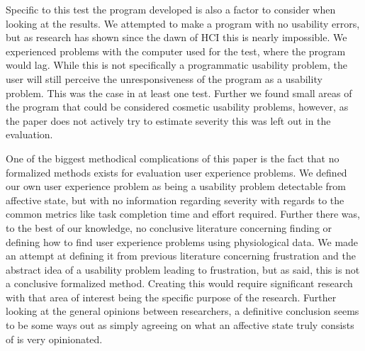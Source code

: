 Specific to this test the program developed is also a factor to consider when looking at the results.
We attempted to make a program with no usability errors, but as research has shown since the dawn of HCI this is nearly impossible. 
We experienced problems with the computer used for the test, where the program would lag. While this is not specifically a programmatic usability problem, the user will still perceive the unresponsiveness of the program as a usability problem. This was the case in at least one test.
Further we found small areas of the program that could be considered cosmetic usability problems, however, as the paper does not actively try to estimate severity this was left out in the evaluation. 

One of the biggest methodical complications of this paper is the fact that no formalized methods exists for evaluation user experience problems. We defined our own user experience problem as being a usability problem detectable from affective state, but with no information regarding severity with regards to the common metrics like task completion time and effort required. Further there was, to the best of our knowledge, no conclusive literature concerning finding or defining how to find user experience problems using physiological data. We made an attempt at defining it from previous literature concerning frustration and the abstract idea of a usability problem leading to frustration, but as said, this is not a conclusive formalized method. Creating this would require significant research with that area of interest being the specific purpose of the research. Further looking at the general opinions between researchers, a definitive conclusion seems to be some ways out as simply agreeing on what an affective state truly consists of is very opinionated. 

